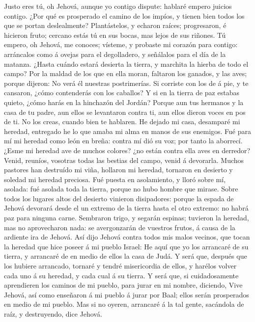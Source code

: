  Justo eres tú, oh Jehová, aunque yo contigo dispute:
hablaré empero juicios contigo. ¿Por qué es prosperado el camino de los
impíos, y tienen bien todos los que se portan deslealmente?
 Plantástelos, y echaron raíces; progresaron, é hicieron
fruto; cercano estás tú en sus bocas, mas lejos de sus riñones.
 Tú empero, oh Jehová, me conoces; vísteme, y probaste mi
corazón para contigo: arráncalos como á ovejas para el degolladero, y
señálalos para el día de la matanza.  ¿Hasta cuándo estará
desierta la tierra, y marchita la hierba de todo el campo? Por la maldad
de los que en ella moran, faltaron los ganados, y las aves; porque
dijeron: No verá él nuestras postrimerías.  Si corriste
con los de á pie, y te cansaron, ¿cómo contenderás con los caballos? Y
si en la tierra de paz estabas quieto, ¿cómo harás en la hinchazón del
Jordán?  Porque aun tus hermanos y la casa de tu padre,
aun ellos se levantaron contra ti, aun ellos dieron voces en pos de ti.
No los creas, cuando bien te hablaren.  He dejado mi casa,
desamparé mi heredad, entregado he lo que amaba mi alma en manos de sus
enemigos.  Fué para mí mi heredad como león en breña:
contra mí dió su voz; por tanto la aborrecí.  ¿Esme mi
heredad ave de muchos colores? ¿no están contra ella aves en derredor?
Venid, reuníos, vosotras todas las bestias del campo, venid á devorarla.
 Muchos pastores han destruído mi viña, hollaron mi
heredad, tornaron en desierto y soledad mi heredad preciosa.
 Fué puesta en asolamiento, y lloró sobre mí, asolada:
fué asolada toda la tierra, porque no hubo hombre que mirase.
 Sobre todos los lugares altos del desierto vinieron
disipadores: porque la espada de Jehová devorará desde el un extremo de
la tierra hasta el otro extremo: no habrá paz para ninguna carne.
 Sembraron trigo, y segarán espinas; tuvieron la heredad,
mas no aprovecharon nada: se avergonzarán de vuestros frutos, á causa de
la ardiente ira de Jehová.  Así dijo Jehová contra todos
mis malos vecinos, que tocan la heredad que hice poseer á mi pueblo
Israel: He aquí que yo los arrancaré de su tierra, y arrancaré de en
medio de ellos la casa de Judá.  Y será que, después que
los hubiere arrancado, tornaré y tendré misericordia de ellos, y harélos
volver cada uno á su heredad, y cada cual á su tierra.  Y
será que, si cuidadosamente aprendieren los caminos de mi pueblo, para
jurar en mi nombre, diciendo, Vive Jehová, así como enseñaron á mi
pueblo á jurar por Baal; ellos serán prosperados en medio de mi pueblo.
 Mas si no oyeren, arrancaré á la tal gente, sacándola de
raíz, y destruyendo, dice Jehová.

